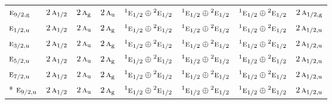 \documentclass[10pt,a4paper]{article}
\numberwithin{equation}{section}
\newcommand{\irr}[1]{\text{\normalfont\scshape #1}}
\newcommand{\conjpair}[1]{{}^{#1}}
\newcommand{\ptag}[1]{\mathrm{#1}}
\begin{document}
{\begin{longtable}{@{}lccccccc@{}}
$\irr{e}_{9/2,\ptag{g}}$ & $2\,\irr{a}_{1/2}$ & $2\,\irr{a}_{\ptag{g}}$ & $2\,\irr{a}_{\ptag{u}}$ & $\conjpair{1}\irr{e}_{1/2}\oplus \conjpair{2}\irr{e}_{1/2}$ & $\conjpair{1}\irr{e}_{1/2}\oplus \conjpair{2}\irr{e}_{1/2}$ & $\conjpair{1}\irr{e}_{1/2}\oplus \conjpair{2}\irr{e}_{1/2}$ & $2\,\irr{a}_{1/2,\ptag{g}}$\\
$\irr{e}_{1/2,\ptag{u}}$ & $2\,\irr{a}_{1/2}$ & $2\,\irr{a}_{\ptag{u}}$ & $2\,\irr{a}_{\ptag{g}}$ & $\conjpair{1}\irr{e}_{1/2}\oplus \conjpair{2}\irr{e}_{1/2}$ & $\conjpair{1}\irr{e}_{1/2}\oplus \conjpair{2}\irr{e}_{1/2}$ & $\conjpair{1}\irr{e}_{1/2}\oplus \conjpair{2}\irr{e}_{1/2}$ & $2\,\irr{a}_{1/2,\ptag{u}}$\\
$\irr{e}_{3/2,\ptag{u}}$ & $2\,\irr{a}_{1/2}$ & $2\,\irr{a}_{\ptag{u}}$ & $2\,\irr{a}_{\ptag{g}}$ & $\conjpair{1}\irr{e}_{1/2}\oplus \conjpair{2}\irr{e}_{1/2}$ & $\conjpair{1}\irr{e}_{1/2}\oplus \conjpair{2}\irr{e}_{1/2}$ & $\conjpair{1}\irr{e}_{1/2}\oplus \conjpair{2}\irr{e}_{1/2}$ & $2\,\irr{a}_{1/2,\ptag{u}}$\\
$\irr{e}_{5/2,\ptag{u}}$ & $2\,\irr{a}_{1/2}$ & $2\,\irr{a}_{\ptag{u}}$ & $2\,\irr{a}_{\ptag{g}}$ & $\conjpair{1}\irr{e}_{1/2}\oplus \conjpair{2}\irr{e}_{1/2}$ & $\conjpair{1}\irr{e}_{1/2}\oplus \conjpair{2}\irr{e}_{1/2}$ & $\conjpair{1}\irr{e}_{1/2}\oplus \conjpair{2}\irr{e}_{1/2}$ & $2\,\irr{a}_{1/2,\ptag{u}}$\\
$\irr{e}_{7/2,\ptag{u}}$ & $2\,\irr{a}_{1/2}$ & $2\,\irr{a}_{\ptag{u}}$ & $2\,\irr{a}_{\ptag{g}}$ & $\conjpair{1}\irr{e}_{1/2}\oplus \conjpair{2}\irr{e}_{1/2}$ & $\conjpair{1}\irr{e}_{1/2}\oplus \conjpair{2}\irr{e}_{1/2}$ & $\conjpair{1}\irr{e}_{1/2}\oplus \conjpair{2}\irr{e}_{1/2}$ & $2\,\irr{a}_{1/2,\ptag{u}}$\\*
$\irr{e}_{9/2,\ptag{u}}$ & $2\,\irr{a}_{1/2}$ & $2\,\irr{a}_{\ptag{u}}$ & $2\,\irr{a}_{\ptag{g}}$ & $\conjpair{1}\irr{e}_{1/2}\oplus \conjpair{2}\irr{e}_{1/2}$ & $\conjpair{1}\irr{e}_{1/2}\oplus \conjpair{2}\irr{e}_{1/2}$ & $\conjpair{1}\irr{e}_{1/2}\oplus \conjpair{2}\irr{e}_{1/2}$ & $2\,\irr{a}_{1/2,\ptag{u}}$\\
\bottomrule\end{longtable}}
\end{document}
